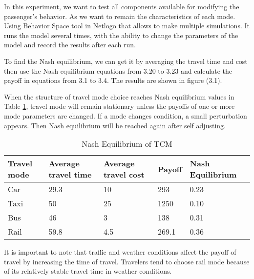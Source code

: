 In this experiment, we want to test all components available for modifying the passenger's behavior. As we want to remain the characteristics of each mode.
Using Behavior Space tool in Netlogo that allows to make multiple simulations. It runs the model several times, with the ability to change the parameters of the model and record the results after each run.

To find the Nash equilibrium, we can get it by averaging the travel time and cost then use the Nash equilibrium equations from 3.20 to 3.23 and calculate the payoff in equations from 3.1 to 3.4. The results are shown in figure (3.1).

When the structure of travel mode choice reaches Nash equilibrium values in Table \ref{table:2}, travel mode will remain stationary unless the payoffs of one or more mode parameters are changed. If a mode changes condition, a small perturbation appears. Then Nash equilibrium will be reached again after self adjusting.
\clearpage

\begin{table}[h!]
\centering
\begin{tabular}{lllll}
\hline
\multicolumn{1}{l}{Travel mode} & \multicolumn{1}{l}{Average travel time} & \multicolumn{1}{l}{Average travel cost} & \multicolumn{1}{l}{Payoff} & Nash~ Equilibrium  \\ 
\hline
Car                             & 29.3                                    & 10                                      & 293                        & 0.23               \\
Taxi                            & 50                                      & 25                                      & 1250                       & 0.10               \\
Bus                             & 46                                      & 3                                       & 138                        & 0.31               \\
Rail                            & 59.8                                    & 4.5                           & 269.1                      
& 0.36                   
\end{tabular}
\caption{Nash Equilibrium of TCM}
\label{table:2}
\end{table}
It is important to note that traffic and weather conditions affect the payoff of travel by increasing the time of travel. Travelers tend to choose rail mode because of its relatively stable travel time in weather conditions.



